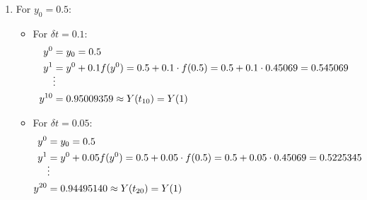 \documentclass[]{article}
\begin{document}
\begin{enumerate}
\begin{itemize}
    \item For $\delta t = 0.05$:
        \begin{align*}
        y^0 &= y_0 = 0\\
        y^1 &= y^0 + 0.05f(y^0) = 0+0.05\cdot f(0) = 0+0.05\cdot 0 = 0\\
      & \smash{\vdots} \\
        y^{20} &= 0 \approx Y(t_{20}) = Y(1)
        \end{align*}

    \item For $\delta t = 0.025$:
        \begin{align*}
        y^0 &= y_0 = 0\\
        y^1 &= y^0 + 0.025f(y^0) = 0+0.025\cdot f(0) = 0+0.025\cdot 0 = 0\\
      & \smash{\vdots} \\
        y^{40} &= 0 \approx Y(t_{40}) = Y(1)
        \end{align*}

    \item For $\delta t = 0.0125$:
       \begin{align*}
        y^0 &= y_0 = 0\\
        y^1 &= y^0 + 0.0125f(y^0) = 0+0.0125\cdot f(0) = 0+0.0125\cdot 0 = 0\\
      & \smash{\vdots} \\
        y^{80} &= 0 \approx Y(t_{80}) = Y(1)
        \end{align*}
\end{itemize}

 \item For $y_0 = 0.5$:
      \begin{itemize}
        \item For $\delta t = 0.1$:
        \begin{align*}
        y^0 &= y_0 = 0.5\\
        y^1 &= y^0 + 0.1f(y^0) = 0.5+0.1\cdot f(0.5) = 0.5+0.1\cdot 0.45069 = 0.545069\\
      & \smash{\vdots} \\
        y^{10} &= 0.95009359 \approx Y(t_{10}) = Y(1)
        \end{align*}
        
    \item For $\delta t = 0.05$:
        \begin{align*}
        y^0 &= y_0 = 0.5\\
        y^1 &= y^0 + 0.05f(y^0) = 0.5+0.05\cdot f(0.5) = 0.5+0.05\cdot 0.45069 = 0.5225345\\
      & \smash{\vdots} \\
        y^{20} &= 0.94495140 \approx Y(t_{20}) = Y(1)
        \end{align*}


\end{itemize}
\end{enumerate}
\end{document}
